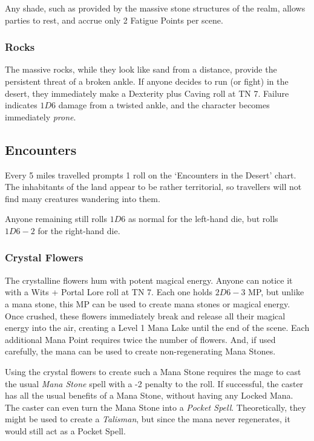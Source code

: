 \begin{multicols}{2}
Any shade, such as provided by the massive stone structures of the realm, allows parties to rest, and accrue only 2 Fatigue Points per scene.

\subsubsection{Rocks}

The massive rocks, while they look like sand from a distance, provide the persistent threat of a broken ankle.
If anyone decides to run (or fight) in the desert, they immediately make a Dexterity plus Caving roll at TN 7.
Failure indicates $1D6$ damage from a twisted ankle, and the character becomes immediately \emph{prone}.

\subsection{Encounters}

Every 5 miles travelled prompts 1 roll on the `Encounters in the Desert' chart.
The inhabitants of the land appear to be rather territorial, so travellers will not find many creatures wandering into them.

Anyone remaining still rolls $1D6$ as normal for the left-hand die,%
but rolls $1D6-2$ for the right-hand die.


\subsubsection{Crystal Flowers}
\label{crystalFlowers}

The crystalline flowers hum with potent magical energy.
Anyone can notice it with a Wits + Portal Lore roll at TN 7.
Each one holds $2D6-3$ MP, but unlike a mana stone, this MP can be used to create mana stones or magical energy.
Once crushed, these flowers immediately break and release all their magical energy into the air, creating a Level 1 Mana Lake until the end of the scene.
Each additional Mana Point requires twice the number of flowers.
And, if used carefully, the mana can be used to create non-regenerating Mana Stones.


Using the crystal flowers to create such a Mana Stone requires the mage to cast the usual \textit{Mana Stone} spell with a -2 penalty to the roll.
If successful, the caster has all the usual benefits of a Mana Stone, without having any Locked Mana.
The caster can even turn the Mana Stone into a \textit{Pocket Spell}.
Theoretically, they might be used to create a \textit{Talisman}, but since the mana never regenerates, it would still act as a Pocket Spell.


\end{multicols}
